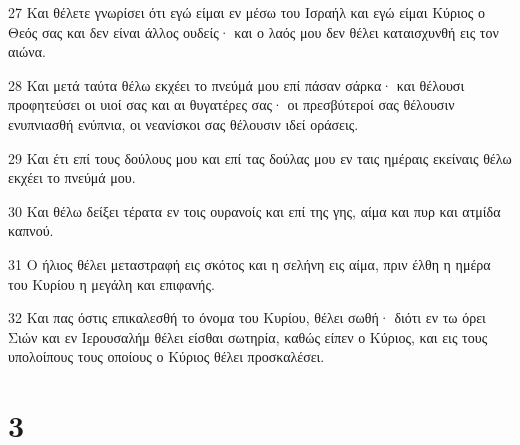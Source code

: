 \par 27 Και θέλετε γνωρίσει ότι εγώ είμαι εν μέσω του Ισραήλ και εγώ είμαι Κύριος ο Θεός σας και δεν είναι άλλος ουδείς· και ο λαός μου δεν θέλει καταισχυνθή εις τον αιώνα.
\par 28 Και μετά ταύτα θέλω εκχέει το πνεύμά μου επί πάσαν σάρκα· και θέλουσι προφητεύσει οι υιοί σας και αι θυγατέρες σας· οι πρεσβύτεροί σας θέλουσιν ενυπνιασθή ενύπνια, οι νεανίσκοι σας θέλουσιν ιδεί οράσεις.
\par 29 Και έτι επί τους δούλους μου και επί τας δούλας μου εν ταις ημέραις εκείναις θέλω εκχέει το πνεύμά μου.
\par 30 Και θέλω δείξει τέρατα εν τοις ουρανοίς και επί της γης, αίμα και πυρ και ατμίδα καπνού.
\par 31 Ο ήλιος θέλει μεταστραφή εις σκότος και η σελήνη εις αίμα, πριν έλθη η ημέρα του Κυρίου η μεγάλη και επιφανής.
\par 32 Και πας όστις επικαλεσθή το όνομα του Κυρίου, θέλει σωθή· διότι εν τω όρει Σιών και εν Ιερουσαλήμ θέλει είσθαι σωτηρία, καθώς είπεν ο Κύριος, και εις τους υπολοίπους τους οποίους ο Κύριος θέλει προσκαλέσει.

\chapter{3}

